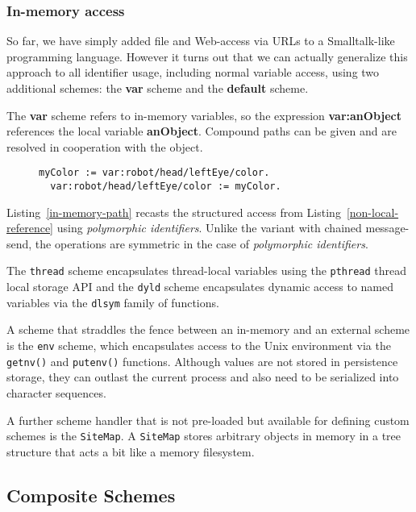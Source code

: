 \documentclass[preprint,authoryear]{acm_proc_article-sp}
\begin{document}
\subsubsection{In-memory access}
\label{inmemory}

So far, we have simply added file and Web-access via URLs to a 
Smalltalk-like programming language.  However it turns out that we can actually generalize
this approach to all identifier usage, including normal variable access, using
two additional schemes:  the {\bf var} scheme and the {\bf default} scheme.

The {\bf var} scheme refers to in-memory variables, so the expression
 {\bf var:anObject} references the
local variable {\bf anObject}.   Compound paths can be given and are resolved in
cooperation with the object.


\begin{figure}[htbp]
\begin{lstlisting}[style=L,label=in-memory-path,caption=In-memory access path.]
  myColor := var:robot/head/leftEye/color.
  var:robot/head/leftEye/color := myColor.
\end{lstlisting}
\end{figure}

Listing~\ref{in-memory-path} recasts the structured access from 
Listing~\ref{non-local-reference} using \emph{polymorphic identifiers}.  Unlike the variant
with chained message-send, the operations are symmetric in the case of \emph{polymorphic identifiers}.

The {\tt thread} scheme encapsulates thread-local variables using the {\tt pthread} thread
local storage API and the {\tt dyld} scheme encapsulates dynamic access to
named variables via the {\tt dlsym} family of functions.

A scheme that straddles the fence between an in-memory and an external 
scheme is the {\tt env} scheme, which encapsulates access to the Unix
environment via the {\tt getnv()} and {\tt putenv()} functions.  Although 
values are not stored in persistence storage, they can outlast the
current process and also need to be serialized into character sequences.

A further scheme handler that is not pre-loaded but available for defining
custom schemes is the {\tt SiteMap}.  A {\tt SiteMap} stores arbitrary objects
in memory in a tree structure that acts a bit like a memory filesystem.

\subsection{Composite Schemes}
\end{document}
